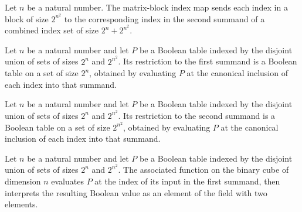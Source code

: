 \begin{definition}
\label{FABL.quadraticMatrixProofIndex}
\leanok
Let $n$ be a natural number. The matrix-block index map sends each index in a block of
size $2^{n^2}$ to the corresponding index in the second summand of a combined index set
of size $2^n+2^{n^2}$.
\end{definition}

\begin{definition}
\label{FABL.quadraticLinearProofTable}
\leanok
{}
Let $n$ be a natural number and let $P$ be a Boolean table indexed by the disjoint union
of sets of sizes $2^n$ and $2^{n^2}$. Its restriction to the first summand is a Boolean
table on a set of size $2^n$, obtained by evaluating $P$ at the canonical inclusion of
each index into that summand.
\end{definition}

\begin{definition}
\label{FABL.quadraticMatrixProofTable}
\leanok
{}
Let $n$ be a natural number and let $P$ be a Boolean table indexed by the disjoint union
of sets of sizes $2^n$ and $2^{n^2}$. Its restriction to the second summand is a Boolean
table on a set of size $2^{n^2}$, obtained by evaluating $P$ at the canonical inclusion
of each index into that summand.
\end{definition}

\begin{definition}
\label{FABL.quadraticLinearProofFunction}
\leanok
{}
Let $n$ be a natural number and let $P$ be a Boolean table indexed by the disjoint union
of sets of sizes $2^n$ and $2^{n^2}$. The associated function on the binary cube of
dimension $n$ evaluates $P$ at the index of its input in the first summand, then
interprets the resulting Boolean value as an element of the field with two elements.
\end{definition}

